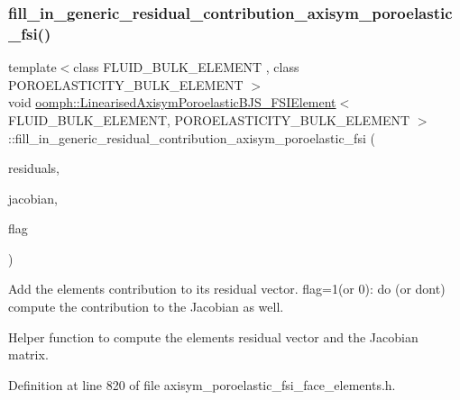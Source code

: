 \subsubsection{\texorpdfstring{fill\+\_\+in\+\_\+generic\+\_\+residual\+\_\+contribution\+\_\+axisym\+\_\+poroelastic\+\_\+fsi()}{fill\_in\_generic\_residual\_contribution\_axisym\_poroelastic\_fsi()}}
{\footnotesize\ttfamily template$<$class F\+L\+U\+I\+D\+\_\+\+B\+U\+L\+K\+\_\+\+E\+L\+E\+M\+E\+NT , class P\+O\+R\+O\+E\+L\+A\+S\+T\+I\+C\+I\+T\+Y\+\_\+\+B\+U\+L\+K\+\_\+\+E\+L\+E\+M\+E\+NT $>$ \\
void \hyperlink{classoomph_1_1LinearisedAxisymPoroelasticBJS__FSIElement}{oomph\+::\+Linearised\+Axisym\+Poroelastic\+B\+J\+S\+\_\+\+F\+S\+I\+Element}$<$ F\+L\+U\+I\+D\+\_\+\+B\+U\+L\+K\+\_\+\+E\+L\+E\+M\+E\+NT, P\+O\+R\+O\+E\+L\+A\+S\+T\+I\+C\+I\+T\+Y\+\_\+\+B\+U\+L\+K\+\_\+\+E\+L\+E\+M\+E\+NT $>$\+::fill\+\_\+in\+\_\+generic\+\_\+residual\+\_\+contribution\+\_\+axisym\+\_\+poroelastic\+\_\+fsi (\begin{DoxyParamCaption}\item[{\hyperlink{classoomph_1_1Vector}{Vector}$<$ double $>$ \&}]{residuals,  }\item[{\hyperlink{classoomph_1_1DenseMatrix}{Dense\+Matrix}$<$ double $>$ \&}]{jacobian,  }\item[{const unsigned \&}]{flag }\end{DoxyParamCaption})\hspace{0.3cm}{\ttfamily [private]}}



Add the element\textquotesingle{}s contribution to its residual vector. flag=1(or 0)\+: do (or don\textquotesingle{}t) compute the contribution to the Jacobian as well. 

Helper function to compute the element\textquotesingle{}s residual vector and the Jacobian matrix. 

Definition at line 820 of file axisym\+\_\+poroelastic\+\_\+fsi\+\_\+face\+\_\+elements.\+h.



